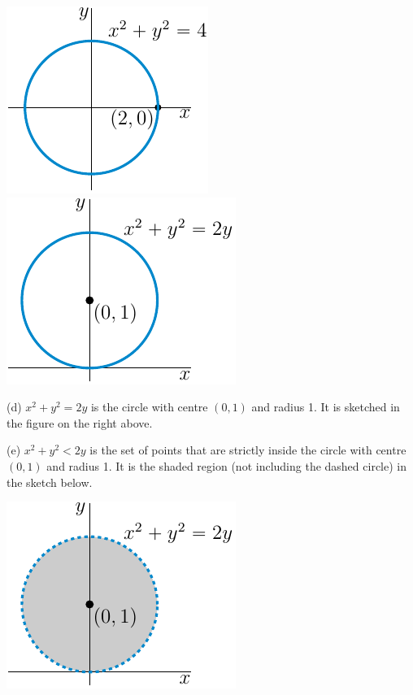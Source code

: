 \begin{answer}
\begin{center}
     \includegraphics{fig/sec1_1_Q1c.pdf}\qquad\qquad
     \includegraphics{fig/sec1_1_Q1d.pdf}
\end{center}

(d) $x^2+y^2=2y$ is the circle with centre $(0,1)$ and radius 1.
It is sketched in the figure on the right above.

(e) $x^2+y^2<2y$ is the set of points that are strictly inside 
the circle with centre $(0,1)$ and radius 1.
It is the shaded region (not including the dashed circle) in the sketch below.

\begin{center}
     \includegraphics{fig/sec1_1_Q1e.pdf}
\end{center}

\end{answer}

